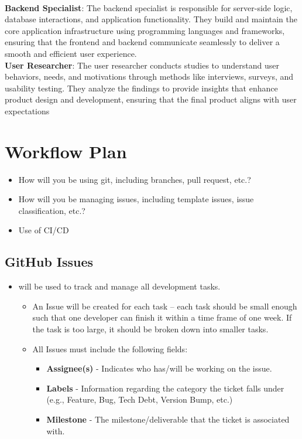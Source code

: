 \documentclass{article}
\begin{document}
\\
\textbf{Backend Specialist}: The backend specialist is responsible for server-side logic, database interactions, and application functionality. They build and maintain the core application infrastructure using programming languages and frameworks, ensuring that the frontend and backend communicate seamlessly to deliver a smooth and efficient user experience.
\\
\textbf{User Researcher}: The user researcher conducts studies to understand user behaviors, needs, and motivations through methods like interviews, surveys, and usability testing. They analyze the findings to provide insights that enhance product design and development, ensuring that the final product aligns with user expectations

\section{Workflow Plan}

\begin{itemize}
    \item How will you be using git, including branches, pull request, etc.?
    \item How will you be managing issues, including template issues, issue classification, etc.?
    \item Use of CI/CD
\end{itemize}

\subsection{GitHub Issues}
\begin{itemize}
    \item will be used to track and manage all development tasks.
    \begin{itemize}
        \item An Issue will be created for each task -- each task should be small enough such that one developer can finish it within a time frame of one week. If the task is too large, it should be broken down into smaller tasks.
        \item All Issues must include the following fields:
        \begin{itemize}
            \item \textbf{Assignee(s)} - Indicates who has/will be working on the issue.
            \item \textbf{Labels} - Information regarding the category the ticket falls under (e.g., Feature, Bug, Tech Debt, Version Bump, etc.)
            \item \textbf{Milestone} - The milestone/deliverable that the ticket is associated with.
        \end{itemize}
    \end{itemize}
\end{itemize}
\end{document}
